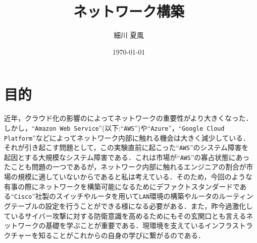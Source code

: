 \documentclass{jlreq}
\title{ネットワーク構築}
\author{細川 夏風}
\date{\today}
\begin{document}
      \maketitle

      \section{目的}
      近年，クラウド化の影響のによってネットワークの重要性がより大きくなった．しかし，``\verb|Amazon Web Service|''(以下:``\verb|AWS|'')や``\verb|Azure|''，``\verb|Google Cloud Platform|''などによってネットワーク内部に触れる機会は大きく減少している．それが引き起こす問題として，この実験直前に起こった``\verb|AWS|''のシステム障害を起因とする大規模なシステム障害である．これは市場が``\verb|AWS|''の寡占状態にあったことも問題の一つであるが，ネットワーク内部に触れるエンジニアの割合が市場の規模に適していないからであると私は考えている．そのため，今回のような有事の際にネットワークを構築可能になるためにデファクトスタンダードである``\verb|Cisco|''社製のスイッチやルータを用いて\verb|LAN|環境の構築やルータのルーティングテーブルの設定を行うことができる様になる必要がある．また，昨今過激化しているサイバー攻撃に対する防衛意識を高めるためにもその玄関口とも言えるネットワークの基礎を学ぶことが重要である．現環境を支えているインフラストラクチャーを知ることがこれからの自身の学びに繋がるのである．
\end{document}
